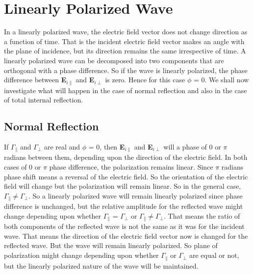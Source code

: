 \section{Linearly Polarized Wave}
In a linearly polarized wave, the electric field vector does not change direction as a function of time. That is the incident electric field vector makes an angle with the plane of incidence, but its direction remains the same irrespective of time. A linearly polarized wave can be decomposed into two components that are orthogonal with a phase difference. So if the wave is linearly polarized, the phase difference between \textbf{E}$_{i\parallel}$ and \textbf{E}$_{i\perp}$ is zero. Hence for this case $\phi$ = 0. We shall now investigate what will happen in the case of normal reflection and also in the case of total internal reflection.

\subsection{Normal Reflection}
If $\Gamma_\parallel$ and $\Gamma_\perp$ are real and $\phi$ = 0, then \textbf{E}$_{i\parallel}$ and \textbf{E}$_{i\perp}$ will a phase of 0 or $\pi$ radians between them, depending upon the direction of the electric field. In both cases of 0 or $\pi$ phase difference, the polarization remains linear. Since $\pi$ radians phase shift means a reversal of the electric field. So the orientation of the electric field will change but the polarization will remain linear. So in the general case, $\Gamma_\parallel \neq \Gamma_\perp$. So a linearly polarized wave will remain linearly polarized since phase difference is unchanged, but the relative amplitude for the reflected wave might change depending upon whether $\Gamma_\parallel$ = $\Gamma_\perp$ or $\Gamma_\parallel \neq \Gamma_\perp$. That means the ratio of both components of the reflected wave is not the same as it was for the incident wave. That means the direction of the electric field vector now is changed for the reflected wave. But the wave will remain linearly polarized. So plane of polarization might change depending upon whether $\Gamma_\parallel$ or $\Gamma_\perp$ are equal or not, but the linearly polarized nature of the wave will be maintained.

